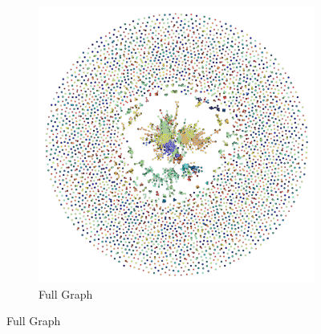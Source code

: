\documentclass[conference]{IEEEtran}
\begin{document}
\begin{figure}[h]
	\centering
	\begin{subfigure}{0.8\columnwidth}
		\includegraphics[width=\columnwidth]{images/MMC_graph_full}
		\caption{Full Graph}
		\label{fig:full_graph}
	\end{subfigure}%


\end{figure}
\end{document}
